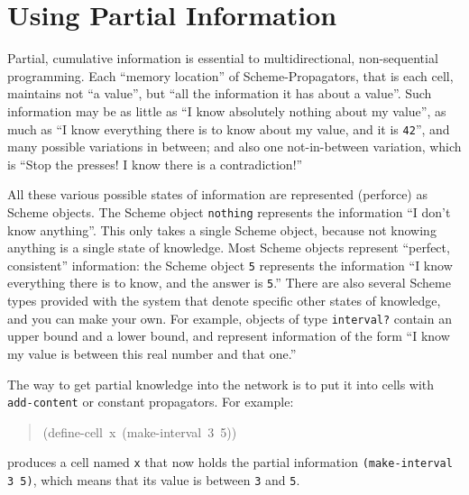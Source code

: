 \documentclass[12pt,letterpaper,english]{article}
\begin{document}
\section{Using Partial Information}
\label{using-partial-information}

Partial, cumulative information is essential to
multidirectional, non-sequential programming.  Each ``memory
location'' of Scheme-Propagators, that is each cell, maintains not ``a
value'', but ``all the information it has about a value''.  Such
information may be as little as ``I know absolutely nothing about my
value'', as much as ``I know everything there is to know about my value,
and it is \texttt{42}'', and many possible variations in between; and also
one not-in-between variation, which is ``Stop the presses!  I know
there is a contradiction!''

All these various possible states of information are represented
(perforce) as Scheme objects.  The Scheme object \texttt{nothing} represents
the information ``I don't know anything''.  This only takes a single
Scheme object, because not knowing anything is a single state of
knowledge.  Most Scheme objects represent ``perfect, consistent''
information: the Scheme object \texttt{5} represents the information ``I
know everything there is to know, and the answer is \texttt{5}.''  There are
also several Scheme types provided with the system that denote
specific other states of knowledge, and you can make your own.  For
example, objects of type \texttt{interval?} contain an upper bound and a
lower bound, and represent information of the form ``I know my value is
between this real number and that one.''

The way to get partial knowledge into the network is to put it into
cells with \texttt{add-content} or constant propagators.  For example:
\begin{quote}{\ttfamily \raggedright \noindent
(define-cell~x~(make-interval~3~5))
}\end{quote}
produces a cell named \texttt{x} that now holds the partial information
\texttt{(make-interval 3 5)}, which means that its value is
between \texttt{3} and \texttt{5}.
\end{document}
